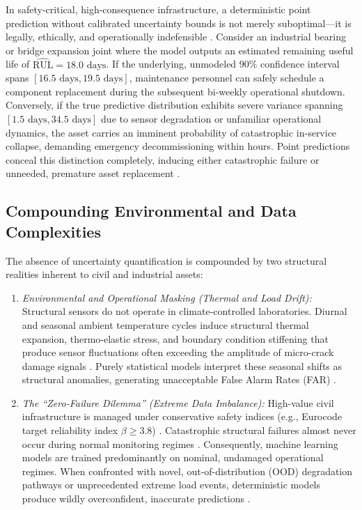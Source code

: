 \documentclass[journal,10pt,twocolumn]{article}
\begin{document}
In safety-critical, high-consequence infrastructure, a deterministic point prediction without calibrated uncertainty bounds is not merely suboptimal---it is legally, ethically, and operationally indefensible \cite{hisamuddin2026ai, wang2026digital}. Consider an industrial bearing or bridge expansion joint where the model outputs an estimated remaining useful life of $\widehat{\text{RUL}} = 18.0 \text{ days}$. If the underlying, unmodeled 90\% confidence interval spans $[16.5 \text{ days}, 19.5 \text{ days}]$, maintenance personnel can safely schedule a component replacement during the subsequent bi-weekly operational shutdown. Conversely, if the true predictive distribution exhibits severe variance spanning $[1.5 \text{ days}, 34.5 \text{ days}]$ due to sensor degradation or unfamiliar operational dynamics, the asset carries an imminent probability of catastrophic in-service collapse, demanding emergency decommissioning within hours. Point predictions conceal this distinction completely, inducing either catastrophic failure or unneeded, premature asset replacement \cite{shehadeh2024economic, brighenti2024predictive}.

\subsection{Compounding Environmental and Data Complexities}
The absence of uncertainty quantification is compounded by two structural realities inherent to civil and industrial assets:
\begin{enumerate}
    \item \textit{Environmental and Operational Masking (Thermal and Load Drift):} Structural sensors do not operate in climate-controlled laboratories. Diurnal and seasonal ambient temperature cycles induce structural thermal expansion, thermo-elastic stress, and boundary condition stiffening that produce sensor fluctuations often exceeding the amplitude of micro-crack damage signals \cite{bello2024digital, mousavi2024evolution, wang2026digital}. Purely statistical models interpret these seasonal shifts as structural anomalies, generating unacceptable False Alarm Rates (FAR) \cite{huwei2024thesis, rezown2025ai}.
    \item \textit{The ``Zero-Failure Dilemma'' (Extreme Data Imbalance):} High-value civil infrastructure is managed under conservative safety indices (e.g., Eurocode target reliability index $\beta \ge 3.8$) \cite{brighenti2024predictive}. Catastrophic structural failures almost never occur during normal monitoring regimes \cite{huwei2024thesis, hisamuddin2026ai}. Consequently, machine learning models are trained predominantly on nominal, undamaged operational regimes. When confronted with novel, out-of-distribution (OOD) degradation pathways or unprecedented extreme load events, deterministic models produce wildly overconfident, inaccurate predictions \cite{hosseinzadeh2023benchmarking, belay2026digital}.
\end{enumerate}
\end{document}

